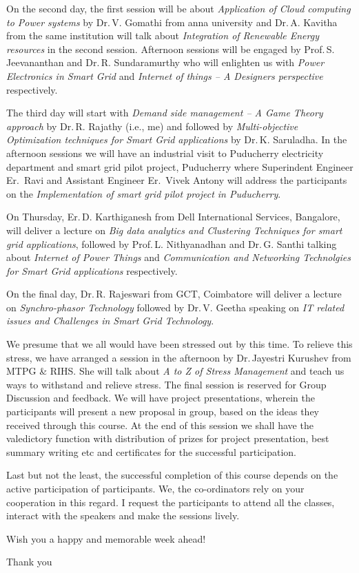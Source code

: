 \documentclass[12pt]{article}
\begin{document}
On the second day, the first session will be about \emph{Application of Cloud computing to Power systems} by Dr.\,V. Gomathi from anna university and Dr.\,A. Kavitha from the same institution will talk about \emph{Integration of Renewable Energy resources} in the second session.  Afternoon sessions will be engaged by Prof.\,S. Jeevananthan and Dr.\,R. Sundaramurthy who will enlighten us with \emph{Power Electronics in Smart Grid} and \emph{Internet of things -- A Designers perspective} respectively.

The third day will start with \emph{Demand side management -- A Game Theory approach} by Dr.\,R. Rajathy (i.e., me) and followed by \emph{Multi-objective Optimization techniques for Smart Grid applications} by Dr.\,K. Saruladha. In the afternoon sessions we will have an industrial visit to Puducherry electricity department and smart grid pilot project, Puducherry where Superindent Engineer Er.\, Ravi and Assistant Engineer Er.\, Vivek Antony will address the participants on the \emph{Implementation of smart grid pilot project in Puducherry}.

On Thursday, Er.\,D. Karthiganesh from Dell International Services, Bangalore, will deliver a lecture on \emph{Big data analytics and Clustering Techniques  for smart grid applications}, followed by Prof.\,L. Nithyanadhan and Dr.\,G. Santhi talking about \emph{Internet of Power Things} and \emph{Communication and Networking Technolgies for Smart Grid applications} respectively.

On the final day, Dr.\,R. Rajeswari from GCT, Coimbatore will deliver a lecture on \emph{Synchro-phasor Technology} followed by Dr.\,V. Geetha speaking on \emph{IT related issues and Challenges in Smart Grid Technology}.

We presume that we all would have been stressed out by this time. To relieve this stress, we have arranged a session in the afternoon by Dr.\,Jayestri Kurushev from MTPG \& RIHS. She will talk about \emph{A to Z of Stress Management} and teach us ways to withstand and relieve stress. The final session is reserved for Group Discussion and feedback. We will have project presentations, wherein the participants will present a new proposal in group, based on the ideas they received through this  course.  At the end of this session we shall have the valedictory function with distribution of prizes for project presentation, best summary writing etc and certificates for the successful participation.

Last but not the least, the successful completion of this course depends on the active participation of participants. We, the co-ordinators rely on your cooperation in this regard. I request the participants to attend all the classes, interact with the speakers and make the sessions lively.

\begin{center}
  \Large Wish you a happy and memorable week ahead!

  Thank you
\end{center}
\end{document}
